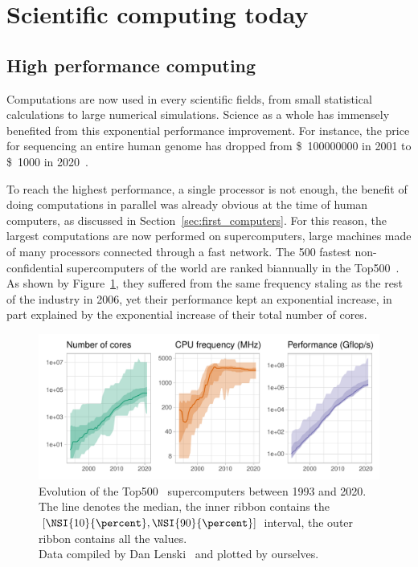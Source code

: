    \section{Scientific computing today}%
    \label{sec:scientific_computing_today}

        \subsection{High performance computing}%
        \label{sub:hpc}

            Computations are now used in every scientific fields, from small statistical calculations to large numerical
            simulations. Science as a whole has immensely benefited from this exponential performance improvement. For
            instance, the price for sequencing an entire human genome has dropped from \SI{100000000}[\$]{} in 2001 to
            \SI{1000}[\$]{} in 2020~\cite{genome_sequencing}.

            To reach the highest performance, a single processor is not enough, the benefit of doing computations in
            parallel was already obvious at the time of human computers, as discussed in Section~\ref{sec:first_computers}.
            For this reason, the largest computations are now performed on supercomputers, large machines made of many
            processors connected through a fast network. The 500 fastest non-confidential supercomputers of the world are
            ranked biannually in the Top500~\cite{top500}. As shown by Figure~\ref{fig:context:top500}, they suffered from
            the same frequency staling as the rest of the industry in 2006, yet their performance kept an exponential
            increase, in part explained by the exponential increase of their total number of cores.

            \begin{figure}[htbp]
                \centering
                \includegraphics[width=\textwidth]{img/context/top500.pdf}
                \caption{\label{fig:context:top500}
                Evolution of the Top500~\cite{top500} supercomputers between 1993 and 2020.  The line denotes the median, the inner ribbon
                contains the \([\NSI{10}{\percent}, \NSI{90}{\percent}]\) interval, the outer ribbon contains all the
                values.\\ Data compiled by Dan Lenski~\cite{top500_compiled} and plotted by ourselves.}
            \end{figure}

